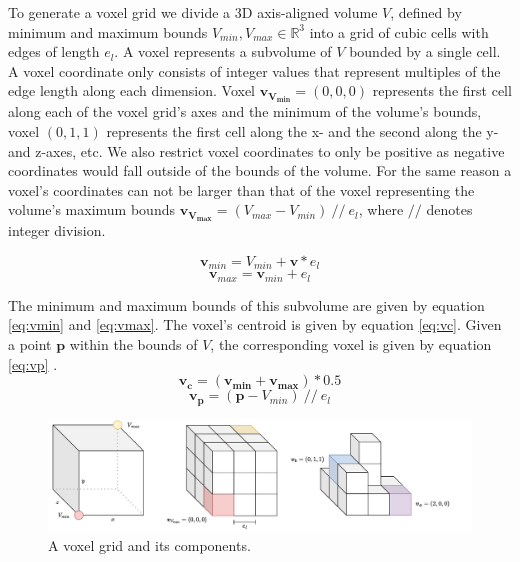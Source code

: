 To generate a voxel grid we divide a 3D axis-aligned volume \(V\), defined by minimum and maximum bounds \(V_{min}, V_{max} \in \mathbb{R}^{3}\) into a grid of cubic cells with edges of length \(e_{l}\). A voxel represents a subvolume of \(V\) bounded by a single cell. A voxel coordinate only consists of integer values that represent multiples of the edge length along each dimension. Voxel \(\boldsymbol{v_{V_{min}}} = (0,0,0)\) represents the first cell along each of the voxel grid's axes and the minimum of the volume's bounds, voxel \((0,1,1)\) represents the first cell along the x- and the second along the y- and z-axes, etc. We also restrict voxel coordinates to only be positive as negative coordinates would fall outside of the bounds of the volume. For the same reason a voxel's coordinates can not be larger than that of the voxel representing the volume's maximum bounds \(\boldsymbol{v_{V_{max}}} = (V_{max} - V_{min})\ //\ e_l\), where \(//\) denotes integer division. 


\begin{equation}
    \label{eq:vmin}
\boldsymbol{v}_{min} = V_{min} + \boldsymbol{v}*e_{l}
\end{equation}
\begin{equation}
    \label{eq:vmax}
\boldsymbol{v}_{max} = \boldsymbol{v}_{min} + e_{l}
\end{equation}

The minimum and maximum bounds of this subvolume are given by equation \ref{eq:vmin} and \ref{eq:vmax}. The voxel's centroid is given by equation \ref{eq:vc}. Given a point \(\boldsymbol{p}\) within the bounds of \(V\), the corresponding voxel is given by equation \ref{eq:vp} . 
\begin{equation}
    \label{eq:vc}
    \boldsymbol{v_c} = (\boldsymbol{v_{min}} + \boldsymbol{v_{max}})*0.5
\end{equation}
\begin{equation}
    \label{eq:vp}
    \boldsymbol{v_p} = (\boldsymbol{p} - V_{min})\ //\ e_l
\end{equation}


\begin{figure}[h]
    \centering
    \includegraphics*[width=\textwidth]{./fig/voxel_basics.pdf}
    \caption{A voxel grid and its components.}
    \label{fig:vg_basic}
\end{figure}

